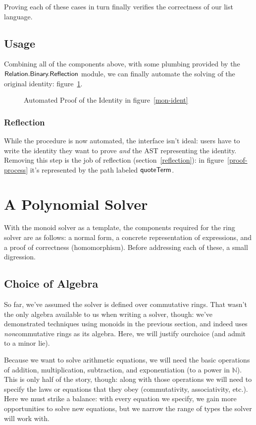 \documentclass[draft, twocolumn]{article}
\theoremstyle{definition}
\theoremstyle{definition}
\begin{document}
Proving each of these cases in turn finally verifies the correctness of our list
language.
\subsection{Usage}
Combining all of the components above, with some plumbing provided by the
\(\AgdaModule{Relation.Binary.Reflection}\) module, we can finally automate the
solving of the original identity: figure~\ref{mon-auto-proof}.
\begin{figure}
  \caption{Automated Proof of the Identity in figure~\ref{mon-ident}}
  \label{mon-auto-proof}
\end{figure}
\subsubsection{Reflection}
While the procedure is now automated, the interface isn't ideal: users have to
write the identity they want to prove \emph{and} the AST representing the
identity. Removing this step is the job of reflection
(section~\ref{reflection}): in figure~\ref{proof-process} it's represented by
the path labeled \(\AgdaKeyword{quoteTerm}\).
\section{A Polynomial Solver} \label{a-poly-solver}
With the monoid solver as a template, the components required for the ring
solver are as follows: a normal form, a concrete representation of
expressions, and a proof of correctness (homomorphism). Before addressing each
of these, a small digression.
\subsection{Choice of Algebra}
So far, we've assumed the solver is defined over commutative rings. That wasn't
the only algebra available to us when writing a solver, though: we've
demonstrated techniques using monoids in the previous section, and
indeed\cite{geuvers_automatically_2017} uses \emph{non}commutative rings as its
algebra. Here, we will justify our\footnotemark choice (and admit to a minor lie).

Because we want to solve arithmetic equations, we will need the basic operations
of addition, multiplication, subtraction, and exponentiation (to a power in
\(\mathbb{N}\)). This is only half of the story, though: along with those
operations we will need to specify the laws or equations that they obey
(commutativity, associativity, etc.). Here we must strike a balance: with every
equation we specify, we gain more opportunities to solve new equations, but we
narrow the range of types the solver will work with.
\end{document}
